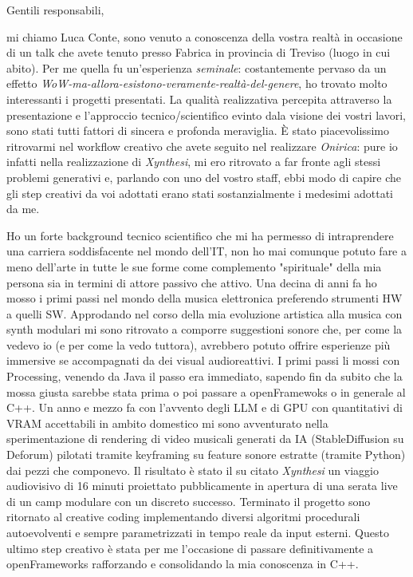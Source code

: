 \documentclass[a4paper,10pt]{letter}
\date{\today}
\begin{document}
\begin{letter}{}

\opening{Gentili responsabili,}

mi chiamo Luca Conte, sono venuto a conoscenza della vostra realtà in occasione di un talk che avete tenuto presso Fabrica in provincia di Treviso (luogo in cui abito). Per me quella fu un'esperienza \textit{seminale}: costantemente pervaso da un effetto \textit{WoW-ma-allora-esistono-veramente-realtà-del-genere}, ho trovato molto interessanti i progetti presentati.  La qualità realizzativa percepita attraverso la presentazione e l'approccio tecnico/scientifico evinto dala visione dei vostri lavori, sono stati tutti fattori di sincera e profonda meraviglia. È stato piacevolissimo ritrovarmi nel workflow creativo che avete seguito nel realizzare \textit{Onirica}: pure io infatti nella realizzazione di \textit{Xynthesi}, mi ero ritrovato a far fronte agli stessi problemi generativi e, parlando con uno del vostro staff, ebbi modo di capire che gli step creativi da voi adottati erano stati sostanzialmente i medesimi adottati da me.

Ho un forte background tecnico scientifico che mi ha permesso di intraprendere una carriera soddisfacente nel mondo dell'IT, non ho mai comunque potuto fare a meno dell'arte in tutte le sue forme come complemento "spirituale" della mia persona sia in termini di attore passivo che attivo. Una decina di anni fa ho mosso i primi passi nel mondo della musica elettronica preferendo strumenti HW a quelli SW. Approdando nel corso della mia evoluzione artistica alla musica con synth modulari mi sono ritrovato a comporre suggestioni sonore che, per come la vedevo io (e per come la vedo tuttora), avrebbero potuto offrire esperienze più immersive  se accompagnati da dei visual audioreattivi. I primi passi li mossi con Processing, venendo da Java il passo era immediato, sapendo fin da subito che la mossa giusta sarebbe stata prima o poi passare a openFramewoks o in generale al C++. Un anno e mezzo fa con l'avvento degli LLM e di GPU con quantitativi di VRAM accettabili in ambito domestico mi sono avventurato nella sperimentazione di rendering di video musicali generati da IA (StableDiffusion su Deforum) pilotati tramite keyframing su feature sonore estratte (tramite Python) dai pezzi che componevo. Il risultato è stato il su citato \textit{Xynthesi} un viaggio audiovisivo di 16 minuti proiettato pubblicamente in apertura di una serata live di un camp modulare con un discreto successo. Terminato il progetto sono ritornato al creative coding implementando diversi algoritmi procedurali autoevolventi e sempre parametrizzati in tempo reale da input esterni. Questo ultimo step creativo è stata per me l'occasione di passare definitivamente a openFrameworks rafforzando e consolidando la mia conoscenza in C++.


\end{letter}
\end{document}
